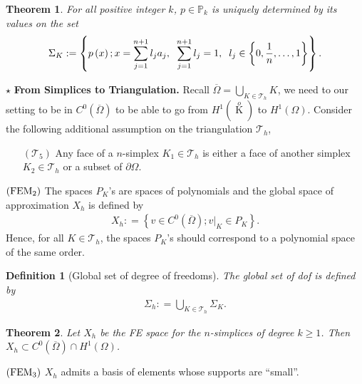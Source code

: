 \documentclass[11pt,a4paper,center,notitlepage]{article}
\numberwithin{equation}{section}
\newtheorem{definition}{Definition}[section]
\newtheorem{theorem}{Theorem}[section]
\begin{document}
\begin{theorem}
For all positive integer $k$, $p\in \mathbb{P}_k$ is uniquely determined by its values on the set 
\begin{align}
{\Sigma _K}: = \left\{ {p\left( x \right);x = \sum\limits_{j = 1}^{n + 1} {{l_j}{a_j}} ,\hspace{2mm}\sum\limits_{j = 1}^{n + 1} {{l_j}}  = 1,\hspace{2mm} {l_j} \in \left\{ {0,\frac{1}{n}, \ldots ,1} \right\}} \right\}.
\end{align}
\end{theorem}
\noindent
$\star$ \textbf{From Simplices to Triangulation.} Recall $\overline \Omega   = \bigcup\nolimits_{K \in {\mathcal{T}_h}} K $, we need to our setting to be in $C^0\left(\overline{\Omega}\right)$ to be able to go from ${H^1}\left( {\mathop K\limits^o } \right)$ to $H^1\left(\Omega\right)$. Consider the following additional assumption on the triangulation $\mathcal{T}_h$,
\begin{itemize}
\item[$\left(\mathcal{T}_5\right)$] Any face of a $n$-simplex $K_1 \in \mathcal{T}_h$ is either a face of another simplex $K_2\in \mathcal{T}_h$ or a subset of $\partial \Omega$.
\end{itemize}
$\left(\rm FEM_2\right)$ The spaces $P_K$'s are spaces of polynomials and the global space of approximation $X_h$ is defined by 
\begin{align}
{X_h}: = \left\{ {v \in {C^0}\left( {\overline \Omega  } \right);{{\left. v \right|}_K} \in {P_K}} \right\}.
\end{align}
Hence, for all $K\in \mathcal{T}_h$, the spaces $P_K$'s should correspond to a polynomial space of the same order.
\begin{definition}[Global set of degree of freedoms]
The \emph{global set of dof} is defined by
\begin{align}
{\Sigma _h}: = \bigcup\limits_{K \in {\mathcal{T}_h}} {{\Sigma _K}} .
\end{align}
\end{definition}

\begin{theorem}
Let $X_h$ be the FE space for the $n$-simplices of degree $k\ge 1$. Then ${X_h} \subset {C^0}\left( {\overline \Omega  } \right) \cap {H^1}\left( \Omega  \right)$.
\end{theorem}
\noindent 
$\left(\rm FEM_3\right)$ $X_h$ admits a basis of elements whose supports are ``small''.
\end{document}
